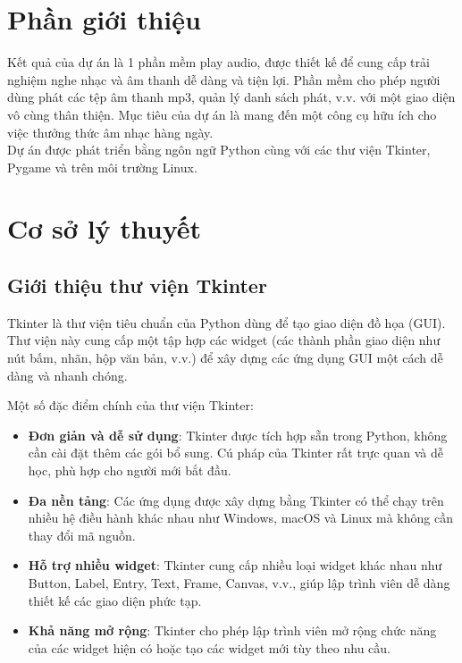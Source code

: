 \documentclass[a4paper]{article}
\begin{document}
\thispagestyle{empty}

\newpage
\tableofcontents
\newpage



\section{Phần giới thiệu}
Kết quả của dự án là 1 phần mềm play audio, được thiết kế để cung cấp trải nghiệm nghe nhạc và âm thanh dễ dàng và tiện lợi. Phần mềm cho phép người dùng phát các tệp âm thanh mp3, quản lý danh sách phát, v.v. với một giao diện vô cùng thân thiện. Mục tiêu của dự án là mang đến một công cụ hữu ích cho việc thưởng thức âm nhạc hàng ngày. \\
Dự án được phát triển bằng ngôn ngữ Python cùng với các thư viện Tkinter, Pygame và trên môi trường Linux. 
\newpage
\section{Cơ sở lý thuyết}
\subsection{Giới thiệu thư viện Tkinter}

Tkinter là thư viện tiêu chuẩn của Python dùng để tạo giao diện đồ họa (GUI). Thư viện này cung cấp một tập hợp các widget (các thành phần giao diện như nút bấm, nhãn, hộp văn bản, v.v.) để xây dựng các ứng dụng GUI một cách dễ dàng và nhanh chóng.

Một số đặc điểm chính của thư viện Tkinter:

\begin{itemize}
    \item \textbf{Đơn giản và dễ sử dụng}: Tkinter được tích hợp sẵn trong Python, không cần cài đặt thêm các gói bổ sung. Cú pháp của Tkinter rất trực quan và dễ học, phù hợp cho người mới bắt đầu.
    \item \textbf{Đa nền tảng}: Các ứng dụng được xây dựng bằng Tkinter có thể chạy trên nhiều hệ điều hành khác nhau như Windows, macOS và Linux mà không cần thay đổi mã nguồn.
    \item \textbf{Hỗ trợ nhiều widget}: Tkinter cung cấp nhiều loại widget khác nhau như Button, Label, Entry, Text, Frame, Canvas, v.v., giúp lập trình viên dễ dàng thiết kế các giao diện phức tạp.
    \item \textbf{Khả năng mở rộng}: Tkinter cho phép lập trình viên mở rộng chức năng của các widget hiện có hoặc tạo các widget mới tùy theo nhu cầu.
\end{itemize}
\end{document}
